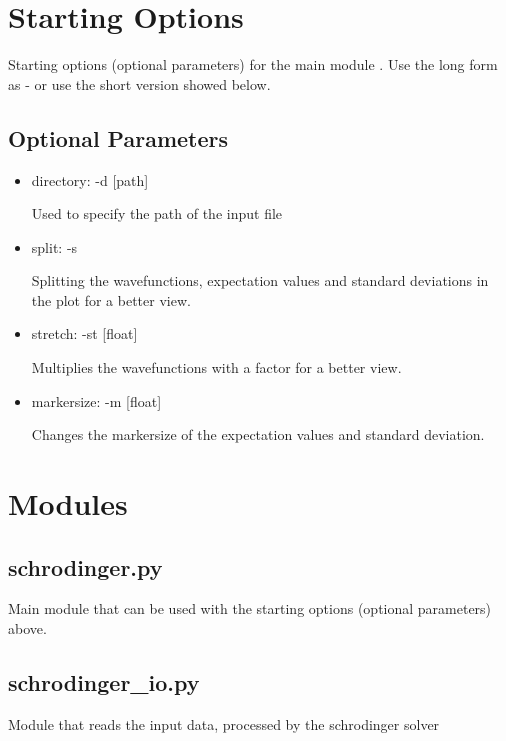 \documentclass[letterpaper,10pt,english]{sphinxmanual}
\begin{document}
\chapter{Starting Options}
\label{\detokenize{index:starting-options}}
Starting options (optional parameters) for the main module .
Use the long form as - or use the short version showed below.


\section{Optional Parameters}
\label{\detokenize{index:optional-parameters}}\begin{itemize}
\item {} 
directory: -d {[}path{]}

Used to specify the path of the input file 

\item {} 
split: -s

Splitting the wavefunctions, expectation values and standard deviations in
the plot for a better view.

\item {} 
stretch: -st {[}float{]}

Multiplies the wavefunctions with a factor for a better view.

\item {} 
markersize: -m {[}float{]}

Changes the markersize of the expectation values and standard deviation.

\end{itemize}


\chapter{Modules}
\label{\detokenize{index:modules}}

\section{schrodinger.py}
\label{\detokenize{index:schrodinger-py}}
Main module that can be used with the starting options (optional parameters)
above.


\section{schrodinger\_io.py}
\label{\detokenize{index:schrodinger-io-py}}\label{\detokenize{index:module-schrodinger_io}}
Module that reads the input data, processed by the schrodinger solver
\end{document}
